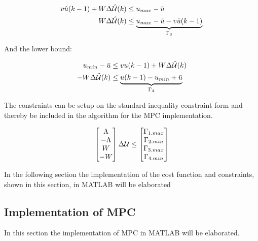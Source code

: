 \begin{equation}
 \begin{aligned}
			 	v\hat{u}(k-1)+W \Delta\hat{\CMcal{U}}(k)  &\leq  u_{max} -  \bar{u} \\
				W\Delta\hat{\CMcal{U}}(k)  &\leq  \underbrace{u_{max} -  \bar{u} - v\hat{u}(k-1)}_{\Gamma_3} \\
 \end{aligned}
 \end{equation}



And the lower bound:

 \begin{equation}
 \begin{aligned}
			 	u_{min} -  \bar{u} &\leq vu(k-1)+W \Delta\hat{\CMcal{U}}(k) \\
-W\Delta\hat{\CMcal{U}}(k) &\leq \underbrace{u(k-1)-u_{min}+\bar{u}}_{\Gamma_4}
 \end{aligned}
 \end{equation}

The constraints can be setup on the standard inequality constraint form and thereby be included in the algorithm for the MPC implementation.

 \begin{equation}
        \begin{bmatrix}
           \Lambda\\
           -\Lambda\\
           W \\
           -W
           \end{bmatrix}
           \Delta\CMcal{U}
           \leq 
           \begin{bmatrix}
         \Gamma_{1.max}\\
         \Gamma_{2.min}\\
         \Gamma_{3.max}\\
         \Gamma_{4.min}

           \end{bmatrix}
 \end{equation}\label{eq:constriants_eq}

 In the following section the implementation of the cost function and constraints, shown in this section, in MATLAB will be elaborated

\subsection{Implementation of MPC}\label{subse:implementation_mpc}
In this section the implementation of MPC in MATLAB will be elaborated. 

